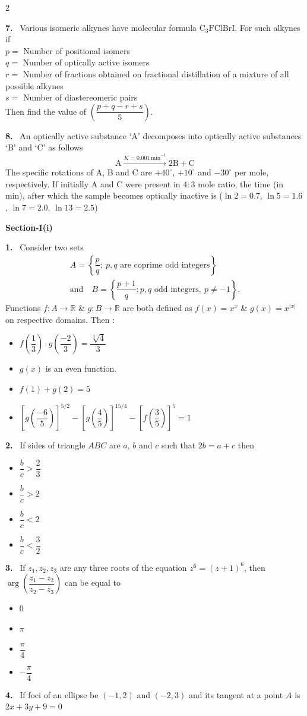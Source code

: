 \documentclass[10pt]{extarticle}
\newcommand{\partsec}[2]{\par\medskip\noindent{\large\bfseries PART-#1: #2}\par\smallskip}
\newcommand{\sect}[1]{\par\smallskip\noindent\textbf{#1}\par}
\newcommand{\qn}[1]{\par\smallskip\noindent\textbf{#1.}~}
\newenvironment{qoptions}{\begin{itemize}[leftmargin=1.8em,itemsep=1pt,topsep=2pt,label={}]}{\end{itemize}}
\newcommand{\opt}[2]{\item[(#1)] #2}
\begin{document}
\begin{multicols}{2}
\qn{7} Various isomeric alkynes have molecular formula $\mathrm{C_3FClBrI}$. For such alkynes if\\
$p=$ Number of positional isomers\\
$q=$ Number of optically active isomers\\
$r=$ Number of fractions obtained on fractional distillation of a mixture of all possible alkynes\\
$s=$ Number of diastereomeric pairs\\
Then find the value of $\left(\dfrac{p+q-r+s}{5}\right)$.
\qn{8} An optically active substance `A' decomposes into optically active substances `B' and `C' as follows
\[\mathrm{A}\xrightarrow{K=0.001\,\mathrm{min}^{-1}}\mathrm{2B+C}\]
The specific rotations of A, B and C are $+40^\circ$, $+10^\circ$ and $-30^\circ$ per mole, respectively. If initially A and C were present in $4:3$ mole ratio, the time (in min), after which the sample becomes optically inactive is ($\ln2=0.7$, $\ln5=1.6$, $\ln7=2.0$, $\ln13=2.5$)
\partsec{3}{MATHEMATICS}
\sect{Section-I(i)}
\qn{1} Consider two sets
\begin{gather*}A=\left\{\dfrac pq;\ p,q\text{ are coprime odd integers}\right\}\\ \text{and}\quad B=\left\{\dfrac{p+1}{q}:p,q\text{ odd integers},\ p\neq-1\right\}.\end{gather*}
Functions $f:A\to\mathbb R$ \& $g:B\to\mathbb R$ are both defined as $f(x)=x^x$ \& $g(x)=x^{|x|}$ on respective domains. Then :
\begin{qoptions}
\opt{A}{$f\!\left(\dfrac13\right)\cdot g\!\left(\dfrac{-2}{3}\right)=\dfrac{\sqrt[3]{4}}{3}$}
\opt{B}{$g(x)$ is an even function.}
\opt{C}{$f(1)+g(2)=5$}
\opt{D}{$\left[g\!\left(\dfrac{-6}{5}\right)\right]^{5/2}-\left[g\!\left(\dfrac45\right)\right]^{15/4}-\left[f\!\left(\dfrac35\right)\right]^5=1$}
\end{qoptions}
\qn{2} If sides of triangle $ABC$ are $a$, $b$ and $c$ such that $2b=a+c$ then
\begin{qoptions}
\opt{A}{$\dfrac bc>\dfrac23$}
\opt{B}{$\dfrac bc>2$}
\opt{C}{$\dfrac bc<2$}
\opt{D}{$\dfrac bc<\dfrac32$}
\end{qoptions}
\qn{3} If $z_1,z_2,z_3$ are any three roots of the equation $z^6=(z+1)^6$, then $\arg\left(\dfrac{z_1-z_2}{z_2-z_3}\right)$ can be equal to
\begin{qoptions}
\opt{A}{$0$}
\opt{B}{$\pi$}
\opt{C}{$\dfrac\pi4$}
\opt{D}{$-\dfrac\pi4$}
\end{qoptions}
\qn{4} If foci of an ellipse be $(-1,2)$ and $(-2,3)$ and its tangent at a point $A$ is $2x+3y+9=0$

\end{multicols}
\end{document}
